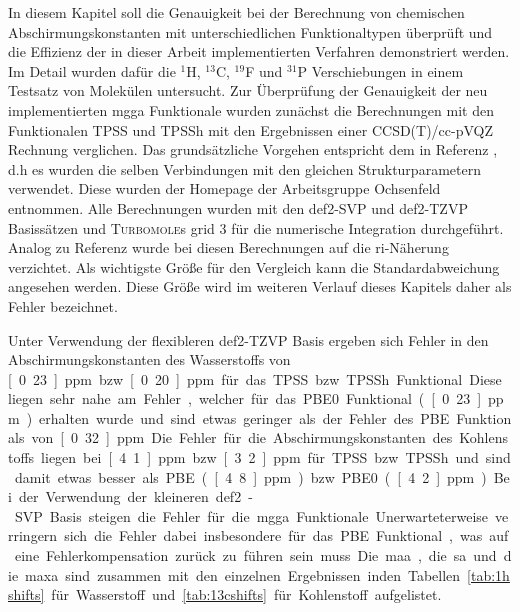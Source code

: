 In diesem Kapitel soll die Genauigkeit bei der Berechnung von chemischen Abschirmungskonstanten mit unterschiedlichen Funktionaltypen überprüft und die Effizienz der in dieser Arbeit implementierten Verfahren demonstriert werden. Im Detail wurden dafür die $^1$H, $^{13}$C, $^{19}$F und $^{31}$P Verschiebungen in einem Testsatz von Molekülen untersucht.\supercite{reiter2017calculation} Zur Überprüfung der Genauigkeit der neu implementierten \ac{mgga} Funktionale wurden zunächst die Berechnungen mit den Funktionalen TPSS und TPSSh mit den Ergebnissen einer CCSD(T)/cc-pVQZ Rechnung verglichen. Das grundsätzliche Vorgehen entspricht dem in Referenz \cite{flaig2014benchmarking}, d.h es wurden die selben Verbindungen mit den gleichen Strukturparametern verwendet. Diese wurden der Homepage der Arbeitsgruppe Ochsenfeld\supercite{ochsenfeld:structures} entnommen. Alle Berechnungen wurden mit den def2-SVP und def2-TZVP Basissätzen\supercite{weigend2005balanced} und \textsc{Turbomole}s grid 3\supercite{treutler1995efficient,treutlerphdthesis} für die numerische Integration durchgeführt. Analog zu Referenz \cite{ochsenfeld2004ab} wurde bei diesen Berechnungen auf die \ac{ri}-Näherung verzichtet. Als wichtigste Größe für den Vergleich kann die Standardabweichung angesehen werden\supercite{flaig2014benchmarking}. Diese Größe wird im weiteren Verlauf dieses Kapitels daher als \glqq Fehler\grqq{} bezeichnet.

Unter Verwendung der flexibleren def2-TZVP Basis ergeben sich Fehler in den Abschirmungskonstanten des Wasserstoffs von \unit[0.23]{ppm} bzw. \unit[0.20]{ppm} für das TPSS bzw. TPSSh Funktional. Diese liegen sehr nahe am Fehler, welcher für das PBE0 Funktional (\unit[0.23]{ppm}) erhalten wurde und sind etwas geringer als der Fehler des PBE Funktionals von \unit[0.32]{ppm}. Die Fehler für die Abschirmungskonstanten des Kohlenstoffs liegen bei \unit[4.1]{ppm} bzw. \unit[3.2]{ppm} für TPSS bzw. TPSSh und sind damit etwas besser als PBE (\unit[4.8]{ppm}) bzw. PBE0 (\unit[4.2]{ppm}) Bei der Verwendung der kleineren def2-SVP Basis steigen die Fehler für die \ac{mgga} Funktionale. Unerwarteterweise verringern sich die Fehler dabei insbesondere für das PBE Funktional, was auf eine Fehlerkompensation zurück zu führen sein muss. Die \ac{maa}, die \ac{sa} und die \ac{maxa} sind zusammen mit den einzelnen Ergebnissen inden Tabellen \ref{tab:1hshifts} für Wasserstoff und \ref{tab:13cshifts} für Kohlenstoff aufgelistet.

